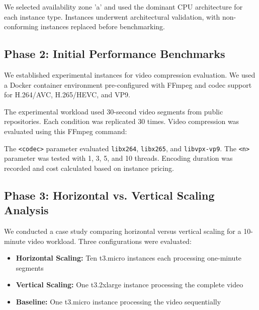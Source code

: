 \documentclass[conference]{IEEEtran}
\begin{document}
	We selected availability zone 'a' and used the dominant CPU architecture for each instance type. Instances underwent architectural validation, with non-conforming instances replaced before benchmarking.
	
	\subsection{Phase 2: Initial Performance Benchmarks}
	\label{execution-initial-performance-benchmarks}
	
	We established experimental instances for video compression evaluation. We used a Docker container environment pre-configured with FFmpeg and codec support for H.264/AVC, H.265/HEVC, and VP9.
	
	The experimental workload used 30-second video segments from public repositories. Each condition was replicated 30 times. Video compression was evaluated using this FFmpeg command:
	
	\begin{center}
		{\ttfamily\scriptsize
		}
	\end{center}
	
	The \texttt{<codec>} parameter evaluated \texttt{libx264}, \texttt{libx265}, and \texttt{libvpx-vp9}. The \texttt{<n>} parameter was tested with 1, 3, 5, and 10 threads. Encoding duration was recorded and cost calculated based on instance pricing.
	
	\subsection{Phase 3: Horizontal vs. Vertical Scaling Analysis}
	
	We conducted a case study comparing horizontal versus vertical scaling for a 10-minute video workload. Three configurations were evaluated:
	\begin{itemize}
		\item \textbf{Horizontal Scaling:} Ten t3.micro instances each processing one-minute segments
		\item \textbf{Vertical Scaling:} One t3.2xlarge instance processing the complete video
		\item \textbf{Baseline:} One t3.micro instance processing the video sequentially
	\end{itemize}
	
\end{document}
